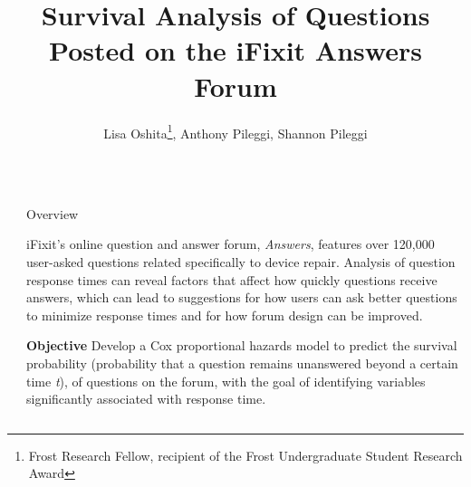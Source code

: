 \documentclass[final]{beamer}
\title{Survival Analysis of Questions Posted on the iFixit Answers Forum} %
\author{Lisa Oshita\footnote{Frost Research Fellow, recipient of the Frost Undergraduate Student Research Award}, Anthony Pileggi, Shannon Pileggi} %
\institute{Department of Statistics, California Polytechnic State University} %
\newlength{\sepwid}
\newlength{\onecolwid}
\begin{document}

\setlength{\belowcaptionskip}{0ex} %
\setlength\belowdisplayshortskip{2ex} %

\begin{frame}[t] %

\begin{columns}[t] %

\begin{column}{\sepwid}\end{column} %

\begin{column}{\onecolwid} %


\begin{alertblock}{Overview}

\vspace{0.5ex}

iFixit's online question and answer forum, \textit{Answers}, features over 120,000 user-asked questions related specifically to device repair. Analysis of question response times can reveal factors that affect how quickly questions receive answers, which can lead to suggestions for how users can ask better questions to minimize response times and for how forum design can be improved. 

\vspace{2ex}

\textcolor{dblue!70}{} \textcolor{dblue!70}{\textbf{Objective}} Develop a Cox proportional hazards model to predict the survival probability (probability that a question remains unanswered beyond a certain time \textit{t}), of questions on the forum, with the goal of identifying variables significantly associated with response time.

\vspace{0.5ex}


\end{alertblock}
\end{column}
\end{columns}
\end{frame}
\end{document}
